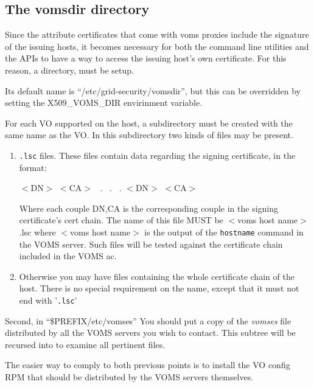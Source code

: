 \documentclass[a4paper]{book}
\begin{document}
\subsection{The vomsdir directory}
Since the attribute certificates that come with voms proxies include
the signature of the issuing hosts, it becomes necessary for both the
command line utilities and the APIs to have a way to access the
issuing host's own certificate.  For this reason, a directory, must be
setup.

Its default name is ``/etc/grid-security/vomsdir'', but this can be
overridden by setting the X509\_VOMS\_DIR envirinment variable.

For each VO supported on the host, a subdirectory must be created with
the same name as the VO.  In this subdirectory two kinds of files may
be present.

\begin{enumerate}
\item \texttt{\*.lsc} files.  These files contain data regarding the
signing certificate, in the format:

$<$DN$>$\newline
$<$CA$>$\newline
\ .\newline
\ .\newline
\ .\newline
$<$DN$>$\newline
$<$CA$>$\newline

Where each couple DN,CA is the corresponding couple in the signing
certificate's cert chain. The name of this file MUST be $<$voms host
name$>$.lsc where $<$voms host name$>$ is the output of the
\texttt{hostname} command in the VOMS server.  Such files will be
tested against the certificate chain included in the VOMS ac.

\item Otherwise you may have files containing the whole certificate
chain of the host.  There is no special requirement on the name,
except that it must not end with '\texttt{.lsc}'
\end{enumerate}



Second, in ``\$PREFIX/etc/vomses'' You should put a copy of the
\emph{vomses} file distributed by all the VOMS servers you wish to
contact.  This subtree will be recursed into to examine all pertinent
files.

The easier way to comply to both previous points is to install the VO
config RPM that should be distributed by the VOMS servers themselves.
\end{document}
